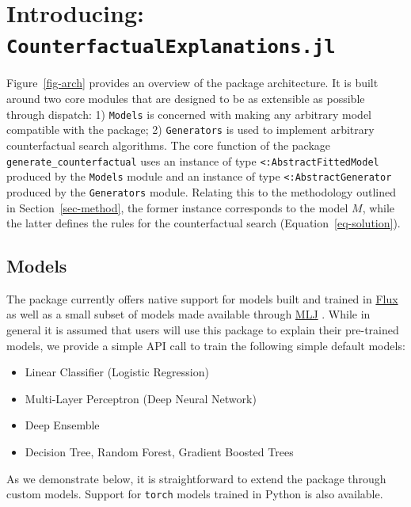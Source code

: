 \documentclass{juliacon}
\begin{document}
\hypertarget{sec-arch}{%
\section{\texorpdfstring{Introducing:
\texttt{CounterfactualExplanations.jl}}{Introducing: CounterfactualExplanations.jl}}\label{sec-arch}}

Figure~\ref{fig-arch} provides an overview of the package architecture.
It is built around two core modules that are designed to be as
extensible as possible through dispatch: 1) \texttt{Models} is concerned
with making any arbitrary model compatible with the package; 2)
\texttt{Generators} is used to implement arbitrary counterfactual search
algorithms. The core function of the package
\texttt{generate\_counterfactual} uses an instance of type
\texttt{\textless{}:AbstractFittedModel} produced by the \texttt{Models}
module and an instance of type \texttt{\textless{}:AbstractGenerator}
produced by the \texttt{Generators} module. Relating this to the
methodology outlined in Section~\ref{sec-method}, the former instance
corresponds to the model \(M\), while the latter defines the rules for
the counterfactual search (Equation~\ref{eq-solution}).

\hypertarget{models}{%
\subsection{Models}\label{models}}

The package currently offers native support for models built and trained
in \href{https://fluxml.ai/}{Flux} as well as a small subset of models
made available through
\href{https://alan-turing-institute.github.io/MLJ.jl/dev/}{MLJ}
\cite{blaom2020mlj}. While in general it is assumed that users will use
this package to explain their pre-trained models, we provide a simple
API call to train the following simple default models:

\begin{itemize}
\item Linear Classifier (Logistic Regression)
\item Multi-Layer Perceptron (Deep Neural Network)
\item Deep Ensemble \cite{lakshminarayanan2016simple}
\item Decision Tree, Random Forest, Gradient Boosted Trees
\end{itemize}

As we demonstrate below, it is straightforward to extend the package
through custom models. Support for \texttt{torch} models trained in
Python is also available.
\end{document}
